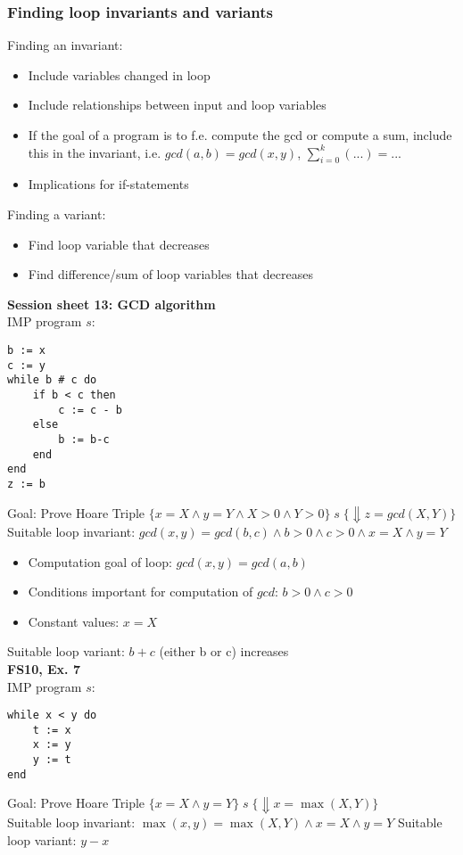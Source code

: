 \documentclass[11.5pt]{article}
\begin{document}
\subsubsection{Finding loop invariants and variants}
Finding an invariant: \begin{itemize}
    \item Include variables changed in loop
    \item Include relationships between input and loop variables
    \item If the goal of a program is to f.e. compute the gcd or compute a sum, include
    this in the invariant, i.e. $gcd(a,b)=gcd(x,y)$, $\sum_{i=0}^{k}(...)=...$
    \item Implications for if-statements
\end{itemize}
Finding a variant:
\begin{itemize}
    \item Find loop variable that decreases
    \item Find difference/sum of loop variables that decreases
\end{itemize}
\smallskip
\textbf{Session sheet 13: GCD algorithm} \\
IMP program $s$:
\begin{verbatim}
b := x
c := y
while b # c do
    if b < c then
        c := c - b
    else
        b := b-c
    end
end
z := b
\end{verbatim}
Goal: Prove Hoare Triple 
$\{x=X \land y=Y\land X > 0 \land Y >0\} \; s \; \{\Downarrow z=gcd(X,Y)\}$ \\
Suitable loop invariant: $gcd(x,y)=gcd(b,c) \land b >0 \land c > 0 \land x=X \land y=Y$ 
\begin{itemize}
    \item Computation goal of loop: $gcd(x,y) = gcd(a,b)$
    \item Conditions important for computation of $gcd$: $b>0 \land c > 0$
    \item Constant values: $x=X$
\end{itemize}
Suitable loop variant: $b+c$ (either b or c) increases
 \smallskip \\
\textbf{FS10, Ex. 7} \\
IMP program $s$:
\begin{verbatim}
while x < y do
    t := x
    x := y
    y := t
end
\end{verbatim}
Goal: Prove Hoare Triple $\{x=X \land y=Y\} \; s \; \{\Downarrow x = \max(X,Y)\}$ \\
Suitable loop invariant: $\max(x,y)=\max(X,Y) \land x=X \land y=Y$
Suitable loop variant: $y-x$ 
\end{document}

